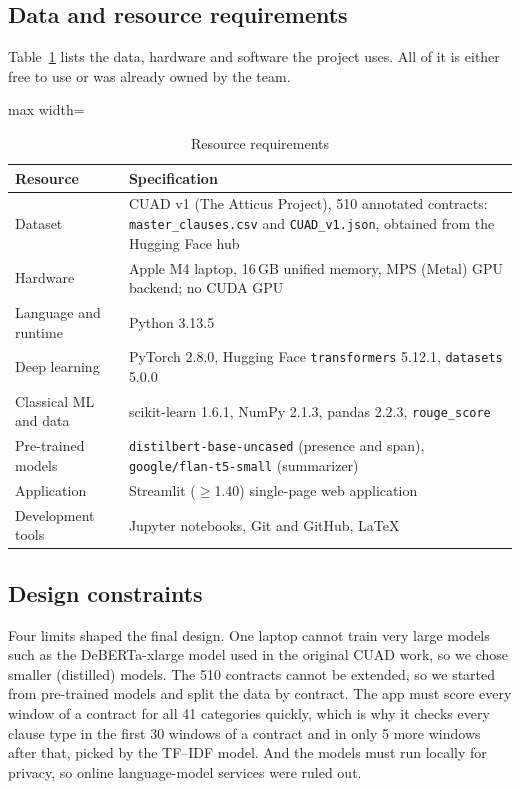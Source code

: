 \subsection{Data and resource requirements}
Table~\ref{tab:resources} lists the data, hardware and software the project uses. All of it is either free to use or was already owned by the team.

\begin{table}[!htbp]
\centering
\caption{Resource requirements}
\label{tab:resources}
\small
\begin{adjustbox}{max width=\textwidth}
\begin{tabular}{>{\raggedright\arraybackslash}p{3.2cm} >{\raggedright\arraybackslash}p{10.2cm}}
\toprule
\textbf{Resource} & \textbf{Specification}\\
\midrule
Dataset & CUAD v1 (The Atticus Project), 510 annotated contracts: \texttt{master\_clauses.csv} and \texttt{CUAD\_v1.json}, obtained from the Hugging Face hub\\
Hardware & Apple M4 laptop, 16\,GB unified memory, MPS (Metal) GPU backend; no CUDA GPU\\
Language and runtime & Python 3.13.5\\
Deep learning & PyTorch 2.8.0, Hugging Face \texttt{transformers} 5.12.1, \texttt{datasets} 5.0.0\\
Classical ML and data & scikit-learn 1.6.1, NumPy 2.1.3, pandas 2.2.3, \texttt{rouge\_score}\\
Pre-trained models & \texttt{distilbert-base-uncased} (presence and span), \texttt{google/flan-t5-small} (summarizer)\\
Application & Streamlit ($\geq$1.40) single-page web application\\
Development tools & Jupyter notebooks, Git and GitHub, \LaTeX\\
\bottomrule
\end{tabular}
\end{adjustbox}
\end{table}

\subsection{Design constraints}
Four limits shaped the final design. One laptop cannot train very large models such as the DeBERTa-xlarge model used in the original CUAD work, so we chose smaller (distilled) models. The 510 contracts cannot be extended, so we started from pre-trained models and split the data by contract. The app must score every window of a contract for all 41 categories quickly, which is why it checks every clause type in the first 30 windows of a contract and in only 5 more windows after that, picked by the TF--IDF model. And the models must run locally for privacy, so online language-model services were ruled out.

